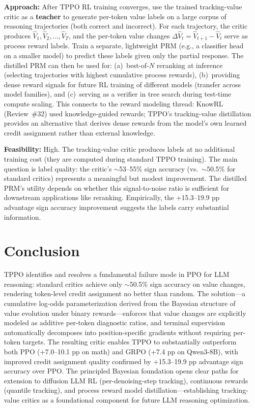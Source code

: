 \documentclass[11pt,a4paper]{article}
\begin{document}
\textbf{Approach:} After TPPO RL training converges, use the trained tracking-value critic as a \textbf{teacher} to generate per-token value labels on a large corpus of reasoning trajectories (both correct and incorrect). For each trajectory, the critic produces $\hat{V}_1, \hat{V}_2, \ldots, \hat{V}_T$, and the per-token value changes $\Delta\hat{V}_t = \hat{V}_{t+1} - \hat{V}_t$ serve as process reward labels. Train a separate, lightweight PRM (e.g., a classifier head on a smaller model) to predict these labels given only the partial response. The distilled PRM can then be used for: (a)~best-of-$N$ reranking at inference (selecting trajectories with highest cumulative process rewards), (b)~providing dense reward signals for future RL training of different models (transfer across model families), and (c)~serving as a verifier in tree search during test-time compute scaling. This connects to the reward modeling thread: KnowRL (Review~\#32) used knowledge-guided rewards; TPPO's tracking-value distillation provides an alternative that derives dense rewards from the model's own learned credit assignment rather than external knowledge.

\textbf{Feasibility:} High. The tracking-value critic produces labels at no additional training cost (they are computed during standard TPPO training). The main question is label quality: the critic's $\sim$53--55\% sign accuracy (vs.\ $\sim$50.5\% for standard critics) represents a meaningful but modest improvement. The distilled PRM's utility depends on whether this signal-to-noise ratio is sufficient for downstream applications like reranking. Empirically, the +15.3--19.9 pp advantage sign accuracy improvement suggests the labels carry substantial information.

\section{Conclusion}
TPPO identifies and resolves a fundamental failure mode in PPO for LLM reasoning: standard critics achieve only $\sim$50.5\% sign accuracy on value changes, rendering token-level credit assignment no better than random. The solution---a cumulative log-odds parameterization derived from the Bayesian structure of value evolution under binary rewards---enforces that value changes are explicitly modeled as additive per-token diagnostic ratios, and terminal supervision automatically decomposes into position-specific gradients without requiring per-token targets. The resulting critic enables TPPO to substantially outperform both PPO (+7.0--10.1 pp on math) and GRPO (+7.4 pp on Qwen3-8B), with improved credit assignment quality confirmed by +15.3--19.9 pp advantage sign accuracy over PPO. The principled Bayesian foundation opens clear paths for extension to diffusion LLM RL (per-denoising-step tracking), continuous rewards (quantile tracking), and process reward model distillation---establishing tracking-value critics as a foundational component for future LLM reasoning optimization.
\end{document}

